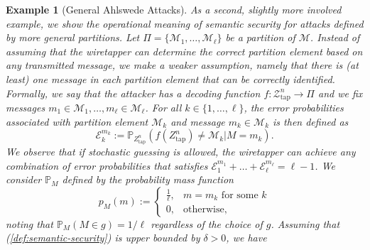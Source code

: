 \documentclass[journal]{IEEEtran}
\newcommand{\lemmaconst}{\delta}
\newcommand{\codebookpmf}{p}
\newcommand{\channelOut}{Z}
\newcommand{\channelOutAlph}{\mathcal{Z}}
\newcommand{\channelOutAlphWiretapper}{\channelOutAlph_\mathrm{tap}}
\newcommand{\channelOutWiretapper}{\channelOut_\mathrm{tap}}
\newcommand{\codebookBlocklength}{n}
\newcommand{\Probability}{\mathbb{P}}
\newcommand{\errorprob}{\mathcal{E}}
\newcommand{\messageRV}{M}
\newcommand{\messageAlphabet}{\mathcal{M}}
\newcommand{\nPartitionElements}{\ell}
\newcommand{\indexPartitions}{k}
\newcommand{\messageAlphabetElement}{m}
\newcommand{\partition}{{\Pi}}
\newcommand{\wiretapperDecoder}{{f}}
\newcommand{\wiretapperGuesser}{{g}}
\newtheorem{example}{Example}
\begin{document}
\begin{example}[General Ahlswede Attacks]
\label{example:semantic-security-general}
As a second, slightly more involved example, we show the operational meaning of semantic security for attacks defined by more general partitions. Let $\partition = \{\messageAlphabet_1, \dots, \messageAlphabet_\nPartitionElements\}$ be a partition of $\messageAlphabet$. Instead of assuming that the wiretapper can determine the correct partition element based on any transmitted message, we make a weaker assumption, namely that there is (at least) one message in each partition element that can be correctly identified. Formally, we say that the attacker has a decoding function $\wiretapperDecoder: \channelOutAlphWiretapper^\codebookBlocklength \rightarrow \partition$ and we fix messages $\messageAlphabetElement_1 \in \messageAlphabet_1, \dots, \messageAlphabetElement_\nPartitionElements \in \messageAlphabet_\nPartitionElements$. For all $\indexPartitions \in \{1, \dots, \nPartitionElements\}$, the error probabilities associated with partition element $\messageAlphabet_\indexPartitions$ and message $\messageAlphabetElement_\indexPartitions \in \messageAlphabet_\indexPartitions$ is then defined as
\[
\errorprob_\indexPartitions^{\messageAlphabetElement_\indexPartitions}
:=
\Probability_{\channelOutWiretapper^\codebookBlocklength} \left(
  \wiretapperDecoder(\channelOutWiretapper^\codebookBlocklength) \neq \messageAlphabet_\indexPartitions
  \big|
  \messageRV = \messageAlphabetElement_\indexPartitions
\right).
\]
We observe that if stochastic guessing is allowed, the wiretapper can achieve any combination of error probabilities that satisfies $\errorprob_1^{\messageAlphabetElement_1} + \dots + \errorprob_\nPartitionElements^{\messageAlphabetElement_\nPartitionElements} = \nPartitionElements - 1$. We consider $\Probability_\messageRV$ defined by the probability mass function
\[
\codebookpmf_\messageRV(\messageAlphabetElement) :=
\begin{cases}
\frac{1}{\nPartitionElements}, & \messageAlphabetElement = \messageAlphabetElement_\indexPartitions \text{ for some } \indexPartitions
\\
0,           & \text{otherwise,}
\end{cases}
\]
noting that $\Probability_{\messageRV}(\messageRV \in \wiretapperGuesser) = 1/\nPartitionElements$ regardless of the choice of $\wiretapperGuesser$. Assuming that (\ref{def:semantic-security}) is upper bounded by $\lemmaconst > 0$, we have
\begin{align}
\label{example:semantic-security-general-def}

\end{align}
\end{example}
\end{document}
